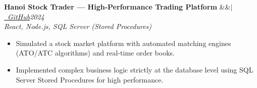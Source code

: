 \documentclass[10pt, a4paper]{article}
\newcommand{\resumeItem}[1]{\item \small #1}
\newcommand{\projectHeader}[3]{
  \vspace{3pt}
  \noindent\textbf{#1} \ifx&#2&\else $|$ \href{#2}{\color{linkcolor}\faGithub\ \textit{GitHub}}\fi \hfill \textit{\footnotesize #3}\\[2pt]
}
\begin{document}
\projectHeader{Hanoi Stock Trader --- High-Performance Trading Platform}{}{2024}
\vspace{-2pt}
{\small \textit{React, Node.js, SQL Server (Stored Procedures)}}
\begin{itemize}
    \resumeItem{Simulated a stock market platform with automated matching engines (ATO/ATC algorithms) and real-time order books.}
    \resumeItem{Implemented complex business logic strictly at the database level using SQL Server Stored Procedures for high performance.}
\end{itemize}

\end{document}

